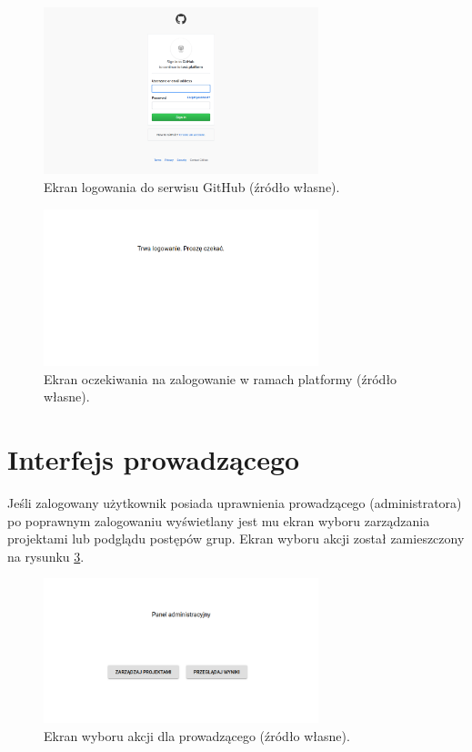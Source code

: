 \begin{figure}[h]
    \centering
    \includegraphics[width = 8cm]{chapter04/log_in_github.png}
    \caption{Ekran logowania do serwisu GitHub (źródło własne).}
    \label{fig:log_in_github}
\end{figure}

\begin{figure}[H]
    \centering
    \includegraphics[width = 8cm]{chapter04/wait_for_login.png}
    \caption{Ekran oczekiwania na zalogowanie w ramach platformy (źródło własne).}
    \label{fig:wait_for_login}
\end{figure}

\section{Interfejs prowadzącego}

Jeśli zalogowany użytkownik posiada uprawnienia prowadzącego (administratora) po poprawnym zalogowaniu wyświetlany jest mu ekran wyboru zarządzania projektami lub podglądu postępów grup.
Ekran wyboru akcji został zamieszczony na rysunku \ref{fig:lecturer_actions}.

\begin{figure}[h]
    \centering
    \includegraphics[width = 8cm]{chapter04/lecturer_actions.png}
    \caption{Ekran wyboru akcji dla prowadzącego (źródło własne).}
    \label{fig:lecturer_actions}
\end{figure}

